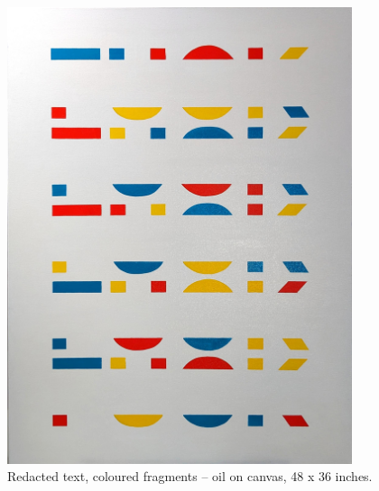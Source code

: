 \documentclass[12pt]{article}
\begin{document}
\begin{figure}[htbp]
  \centering
  \includegraphics*[width=0.9\textwidth]{colour.jpg}
  \caption{Redacted text, coloured fragments -- oil on canvas, 48 x 36 inches.}
  \label{fig:colour}
\end{figure}
\end{document}
